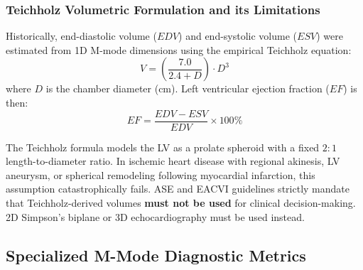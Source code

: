 \documentclass[11pt,a4paper]{article}
\begin{document}
\subsubsection{Teichholz Volumetric Formulation and its Limitations}
Historically, end-diastolic volume ($EDV$) and end-systolic volume ($ESV$) were estimated from 1D M-mode dimensions using the empirical Teichholz equation:
\begin{equation}
    V = \left( \frac{7.0}{2.4 + D} \right) \cdot D^3
\end{equation}
where $D$ is the chamber diameter ($\text{cm}$). Left ventricular ejection fraction ($EF$) is then:
\begin{equation}
    EF = \frac{EDV - ESV}{EDV} \times 100\%
\end{equation}

\begin{clinicalpearl}
The Teichholz formula models the LV as a prolate spheroid with a fixed $2:1$ length-to-diameter ratio. In ischemic heart disease with regional akinesis, LV aneurysm, or spherical remodeling following myocardial infarction, this assumption catastrophically fails. ASE and EACVI guidelines strictly mandate that Teichholz-derived volumes \textbf{must not be used} for clinical decision-making. 2D Simpson's biplane or 3D echocardiography must be used instead.
\end{clinicalpearl}

\subsection{Specialized M-Mode Diagnostic Metrics}
\end{document}
